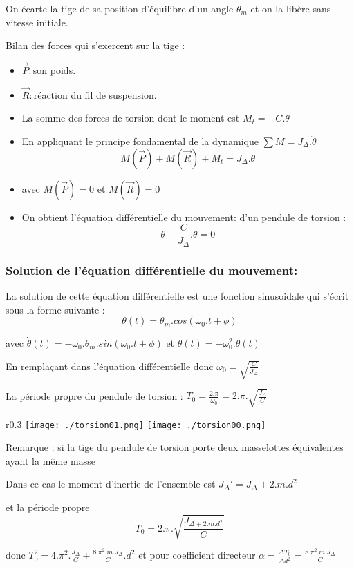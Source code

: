 \documentclass[12pt]{article}
\begin{document}
On écarte la tige de sa position d'équilibre d'un angle  $\theta_m$ et on la libère sans vitesse initiale.

Bilan des forces qui s'exercent sur la tige :
\begin{itemize}

	\item $\vec{P}:$son poids.
	\item $\vec{R}:$réaction du fil de suspension.
	\item La somme des forces de torsion dont le moment est $M_t = -C.\theta$
	\item En appliquant le principe fondamental de la dynamique $\sum M = J_{\Delta}.\ddot{\theta}$
		$$M(\vec{P}) + M(\vec{R}) + M_t = J_{\Delta}.\ddot{\theta}$$
	\item avec $M(\vec{P}) = 0$ et $M(\vec{R}) = 0 $
	\item On obtient l'équation différentielle du mouvement: d'un pendule de torsion : $$\ddot{\theta} + \frac{C}{J_{\Delta}}.\theta = 0$$
\end{itemize}

\subsubsection{Solution de l'équation différentielle du mouvement: }
La solution de cette équation différentielle est une fonction sinusoidale qui s'écrit sous la forme suivante :
 $$\theta(t) = \theta_m.cos(\omega_0.t + \phi)$$ 

 avec  $\dot{\theta}(t) = -\omega_0.\theta_m.sin(\omega_0.t + \phi)$
  et $\ddot{\theta}(t) = -\omega_0^2.\theta(t)$

  En remplaçant dans l'équation différentielle donc $\omega_0 = \sqrt{\frac{C}{J_{\Delta}}}$

  La période propre du pendule de torsion : $T_0  = \frac{2.\pi}{\omega_0} = 2.\pi.\sqrt{\frac{J_{\Delta}}{C}}$

  \begin{tcolorbox}
\begin{wrapfigure}{r}{0.3\textwidth}
	\vspace{-2cm}
	\texttt{[image: ./torsion01.png]}
	\texttt{[image: ./torsion00.png]}
\end{wrapfigure}


Remarque : si la tige du pendule de torsion porte deux masselottes équivalentes ayant la même masse

Dans ce cas le moment d'inertie de l'ensemble est $J_{\Delta}'  = J_{\Delta} + 2.m.d^2$

et la période propre $$T_0 = 2.\pi.\sqrt{\frac{J_{\Delta + 2.m.d^2}}{C}}$$

donc $T_0^2 = 4.\pi^2.\frac{J_{\Delta}}{C} + \frac{8.\pi^2.m.J_{\Delta}}{C}.d^2$
et pour coefficient directeur $\alpha = \frac{\Delta{T_0}}{\Delta{d^2}} = \frac{8.\pi^2.m.J_{\Delta}}{C}$
  \end{tcolorbox}
\end{document}
